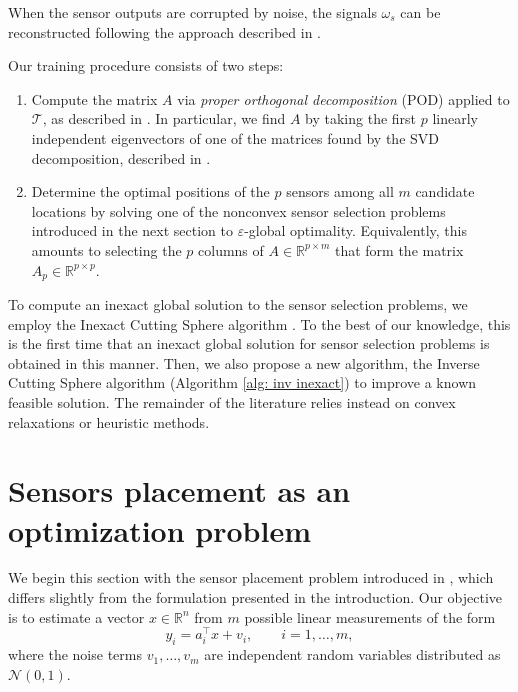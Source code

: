 \documentclass[12pt]{amsart}
\theoremstyle{plain}
\theoremstyle{definition}
\begin{document}
When the sensor outputs are corrupted by noise, the signals $\omega_s$ can be reconstructed following the approach described in \cite{Karnik2026}.

Our training procedure consists of two steps:
\begin{enumerate}
    \item Compute the matrix $A$ via \emph{proper orthogonal decomposition} (POD) applied to $\mathcal{T}$, as described in \cite{manohar2017data}. 
    In particular, we find $A$ by taking the first $p$ linearly independent eigenvectors of one of the matrices found by the SVD decomposition, described in \cite[equation 13]{manohar2017data}.
    \item Determine the optimal positions of the $p$ sensors among all $m$ candidate locations by solving one of the nonconvex sensor selection problems introduced in the next section to $\varepsilon$-global optimality. Equivalently, this amounts to selecting the $p$ columns of $A \in \mathbb{R}^{p \times m}$ that form the matrix $A_p \in \mathbb{R}^{p \times p}$.
\end{enumerate}

To compute an inexact global solution to the sensor selection problems, we employ the Inexact Cutting Sphere algorithm \cite[Algorithm 3]{bednarczuk2026outer}. To the best of our knowledge, this is the first time that an inexact global solution for sensor selection problems is obtained in this manner.
Then, we also propose a new algorithm, the Inverse Cutting Sphere algorithm (Algorithm \ref{alg: inv inexact}) to improve a known feasible solution.
The remainder of the literature relies instead on convex relaxations or heuristic methods.	
		
	\section{Sensors placement as an optimization problem}
\label{sec: models}

We begin this section with the sensor placement problem introduced in \cite{Joshi2009}, which differs slightly from the formulation presented in the introduction. Our objective is to estimate a vector $x \in \mathbb{R}^n$ from $m$ possible linear measurements of the form
\begin{equation}
y_i = a_i^\top x + v_i, \qquad i = 1, \dots, m,
\end{equation}
where the noise terms $v_1, \dots, v_m$ are independent random variables distributed as $\mathcal{N}(0,1)$.
\end{document}
